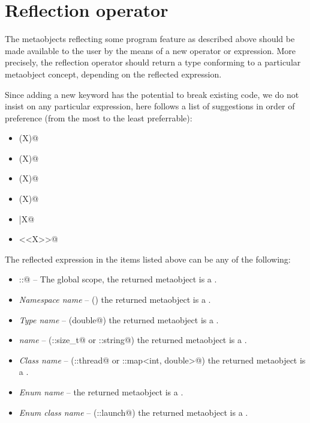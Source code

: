 \section{Reflection operator}
\label{section-reflection-operator}

The metaobjects reflecting some program feature \verb@X@ as
described above should be made available to the user by
the means of a new operator or expression.
More precisely, the reflection operator should return a type conforming to a particular
metaobject concept, depending on the reflected expression.

Since adding a new keyword has the potential to break existing code,
we do not insist on any particular expression, here follows a list of suggestions
in order of preference (from the most to the least preferrable):

\begin{itemize}
\item{\verb@mirrored(X)@}
\item{\verb@reflected(X)@}
\item{\verb@reflexpr(X)@}
\item{\verb@constexpr(X)@}
\item{\verb@|X@}
\item{\verb@<<X>>@}
\end{itemize}

The reflected expression \verb@X@ in the items listed above can be any of the following:

\begin{itemize}
\item{\verb@::@} -- The global scope, the returned metaobject is a {}.
\item{{\em Namespace name}} -- (\verb@std@) the returned metaobject is a {}.
\item{{\em Type name}} -- (\verb@long double@) the returned metaobject is a {}.
\item{{\em \verb@typedef@ name}} -- (\verb@std::size_t@ or \verb@std::string@)
     the returned metaobject is a {}.
\item{{\em Class name}} -- (\verb@std::thread@ or \verb@std::map<int, double>@)
     the returned metaobject is a {}.
\item{{\em Enum name}} -- 
     the returned metaobject is a {}.
\item{{\em Enum class name}} -- (\verb@std::launch@)
     the returned metaobject is a {}.
\end{itemize}

